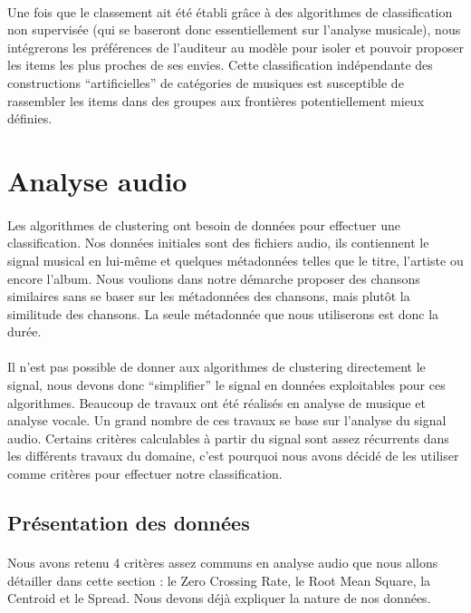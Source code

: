 \documentclass[soumission]{ir}
\begin{document}
\paragraph{}
Une fois que le classement ait été établi grâce à des algorithmes de classification non supervisée (qui se 
baseront donc essentiellement sur l’analyse musicale), nous intégrerons les préférences de l’auditeur au 
modèle pour isoler et pouvoir proposer les items les plus proches de ses envies. Cette classification 
indépendante des constructions “artificielles” de catégories de musiques est susceptible de rassembler les 
items dans des groupes aux frontières potentiellement mieux définies.

\section{Analyse audio}
\paragraph{}
Les algorithmes de clustering ont besoin de données pour effectuer une classification. Nos données initiales 
sont des fichiers audio, ils contiennent le signal musical en lui-même et quelques métadonnées telles que le 
titre, l’artiste ou encore l'album. Nous voulions dans notre démarche proposer des chansons similaires sans 
se baser sur les métadonnées des chansons, mais plutôt la similitude des chansons. La seule métadonnée que 
nous utiliserons est donc la durée.

\paragraph{}
Il n’est pas possible de donner aux algorithmes de clustering directement le signal, nous devons donc 
“simplifier” le signal en données exploitables pour ces algorithmes. Beaucoup de travaux ont été réalisés 
en analyse de musique et analyse vocale. Un grand nombre de ces travaux se base sur l’analyse du signal 
audio. Certains critères calculables à partir du signal sont assez récurrents dans les différents travaux 
du domaine, c’est pourquoi nous avons décidé de les utiliser comme critères pour effectuer notre 
classification.

\subsection{Présentation des données}
\paragraph{}
Nous avons retenu 4 critères assez communs en analyse audio que nous allons détailler dans cette section : 
le Zero Crossing Rate, le Root Mean Square, la Centroid et le Spread. Nous devons déjà expliquer la nature 
de nos données.
\end{document}
